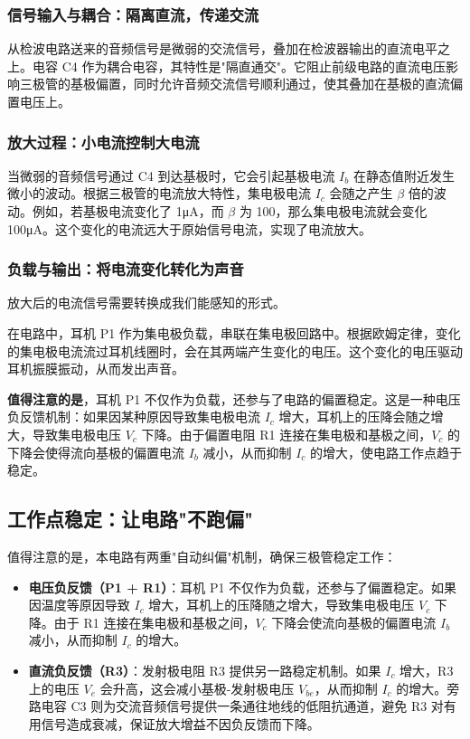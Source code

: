 \documentclass[12pt,UTF8]{ctexbook}
\begin{document}
\subsubsection{信号输入与耦合：隔离直流，传递交流}

从检波电路送来的音频信号是微弱的交流信号，叠加在检波器输出的直流电平之上。电容 C4 作为耦合电容，其特性是"隔直通交"。它阻止前级电路的直流电压影响三极管的基极偏置，同时允许音频交流信号顺利通过，使其叠加在基极的直流偏置电压上。

\subsubsection{放大过程：小电流控制大电流}

当微弱的音频信号通过 C4 到达基极时，它会引起基极电流 $I_b$ 在静态值附近发生微小的波动。根据三极管的电流放大特性，集电极电流 $I_c$ 会随之产生 $\beta$ 倍的波动。例如，若基极电流变化了 1μA，而 $\beta$ 为 100，那么集电极电流就会变化 100μA。这个变化的电流远大于原始信号电流，实现了电流放大。

\subsubsection{负载与输出：将电流变化转化为声音}

放大后的电流信号需要转换成我们能感知的形式。

在电路中，耳机 P1 作为集电极负载，串联在集电极回路中。根据欧姆定律，变化的集电极电流流过耳机线圈时，会在其两端产生变化的电压。这个变化的电压驱动耳机振膜振动，从而发出声音。

\textbf{值得注意的是}，耳机 P1 不仅作为负载，还参与了电路的偏置稳定。这是一种电压负反馈机制：如果因某种原因导致集电极电流 $I_c$ 增大，耳机上的压降会随之增大，导致集电极电压 $V_c$ 下降。由于偏置电阻 R1 连接在集电极和基极之间，$V_c$ 的下降会使得流向基极的偏置电流 $I_b$ 减小，从而抑制 $I_c$ 的增大，使电路工作点趋于稳定。

\subsection{工作点稳定：让电路"不跑偏"}

值得注意的是，本电路有两重"自动纠偏"机制，确保三极管稳定工作：

\begin{itemize}[leftmargin=2cm]
	\item \textbf{电压负反馈（P1 + R1）}：耳机 P1 不仅作为负载，还参与了偏置稳定。如果因温度等原因导致 $I_c$ 增大，耳机上的压降随之增大，导致集电极电压 $V_c$ 下降。由于 R1 连接在集电极和基极之间，$V_c$ 下降会使流向基极的偏置电流 $I_b$ 减小，从而抑制 $I_c$ 的增大。
	\item \textbf{直流负反馈（R3）}：发射极电阻 R3 提供另一路稳定机制。如果 $I_c$ 增大，R3 上的电压 $V_e$ 会升高，这会减小基极-发射极电压 $V_{be}$，从而抑制 $I_c$ 的增大。旁路电容 C3 则为交流音频信号提供一条通往地线的低阻抗通道，避免 R3 对有用信号造成衰减，保证放大增益不因负反馈而下降。
\end{itemize}
\end{document}
